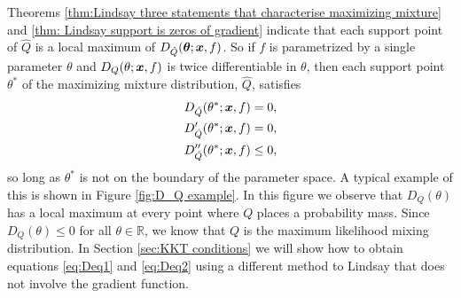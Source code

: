 	Theorems \ref{thm:Lindsay three statements that characterise maximizing mixture} and \ref{thm: Lindsay support is zeros of gradient} indicate that each support point of $\hat{Q}$ is a local maximum of $D_{\hat{Q}}({\bm{{\theta}}}; {\bm{{x}}}, f)$. So if $f$ is parametrized by a single parameter $\theta$ and $D_Q(\theta;{\bm{{x}}},f)$ is twice differentiable in $\theta$, then each support point $\theta^*$ of the maximizing mixture distribution, $\hat{Q}$, satisfies
	\begin{align}
		D_{\hat{Q}}(\theta^*;{\bm{{x}}}, f) &= 0, 
		\label{eq:Deq1}\\
		D'_{\hat{Q}}(\theta^*;{\bm{{x}}}, f) &= 0, 
		\label{eq:Deq2}\\
		D''_{\hat{Q}}(\theta^*;{\bm{{x}}}, f) &\leq 0,
		\label{eq:Deq3}
	\end{align}
	so long as $\theta^*$ is not on the boundary of the parameter space. A typical example of this is shown in Figure \ref{fig:D_Q example}. In this figure we observe that $D_Q(\theta)$ has a local maximum at every point where $Q$ places a probability mass. Since $D_Q(\theta) \leq 0$ for all $\theta \in \mathbb{R}$, we know that $Q$ is the maximum likelihood mixing distribution. In Section \ref{sec:KKT conditions} we will show how to obtain equations \eqref{eq:Deq1} and \eqref{eq:Deq2} using a different method to Lindsay that does not involve the gradient function.


